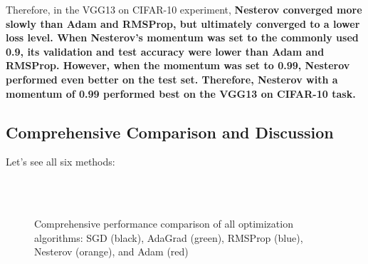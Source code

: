 \documentclass[12pt]{article}
\begin{document}
Therefore, in the VGG13 on CIFAR-10 experiment, \textbf{Nesterov converged more slowly than Adam and RMSProp, but ultimately converged to a lower loss level. When Nesterov's momentum was set to the commonly used 0.9, its validation and test accuracy were lower than Adam and RMSProp. However, when the momentum was set to 0.99, Nesterov performed even better on the test set. Therefore, Nesterov with a momentum of 0.99 performed best on the VGG13 on CIFAR-10 task.}

\subsection{Comprehensive Comparison and Discussion}

Let's see all six methods:


\begin{figure}[htbp]
    \centering
     \quad
     \\
     \quad
     \\
     \quad
    \caption{Comprehensive performance comparison of all optimization algorithms: SGD (black), AdaGrad (green), RMSProp (blue), Nesterov (orange), and Adam (red)}
    \label{fig:comprehensive_comparison_final}
\end{figure}
\end{document}
